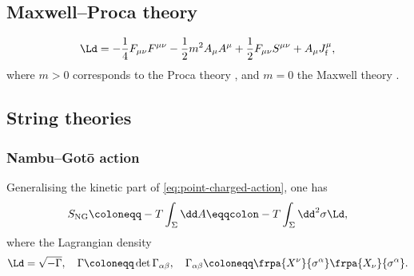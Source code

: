 \documentclass[a4paper,11pt]{article}
\begin{document}
\subsection{Maxwell--Proca theory}

\begin{equation}
\Ld = -\frac{1}{4} F_{\mu\nu} F^{\mu\nu} - \frac{1}{2}m^2 A_\mu A^\mu + 
\frac{1}{2} F_{\mu\nu} S^{\mu\nu} + A_\mu J^\mu_\text{f},
\end{equation}
where $m > 0$ corresponds to the Proca theory \cite[sec.\ 2.3]{Gitman1990}, and 
$m = 0$ the Maxwell theory \cite[sec.\ 3.3.3]{Rothe2010} \cite[sec.\ 
2.4]{Gitman1990}.






\subsection{String theories}

\subsubsection*{Nambu--Gotō action}

Generalising the kinetic part of \eqref{eq:point-charged-action}, one has
\begin{equation}
S_\text{NG} \coloneqq -T \int_\Sigma \dd A
\eqqcolon -T \int_\Sigma\dd^2\sigma \Ld,
\end{equation}
where the Lagrangian density
\begin{equation}
\Ld = \sqrt{-\Gamma},\quad
\Gamma \coloneqq \det \Gamma_{\alpha\beta},\quad
\Gamma_{\alpha\beta} \coloneqq \frpa{X^\nu}{\sigma^\alpha} 
\frpa{X_\nu}{\sigma^\alpha}.
\end{equation}
\end{document}
